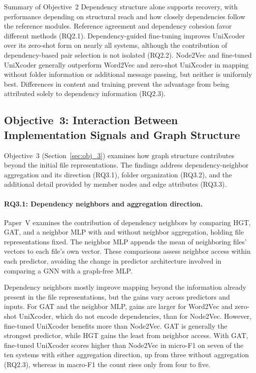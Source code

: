 \begin{GrayBox}{Summary of Objective~2}
Dependency structure alone supports recovery, with performance depending on structural reach and how closely dependencies follow the reference modules. Reference agreement and dependency cohesion favor different methods (RQ2.1). Dependency-guided fine-tuning improves UniXcoder over its zero-shot form on nearly all systems, although the contribution of dependency-based pair selection is not isolated (RQ2.2). Node2Vec and fine-tuned UniXcoder generally outperform Word2Vec and zero-shot UniXcoder in mapping without folder information or additional message passing, but neither is uniformly best. Differences in content and training prevent the advantage from being attributed solely to dependency information (RQ2.3).
\end{GrayBox}

\subsection[Objective~3: Implementation Signals and Graph Structure]{Objective~3: Interaction Between Implementation Signals and Graph Structure}\label{sec:cont_3}

Objective~3 (Section~\ref{sec:obj_3}) examines how graph structure contributes beyond the initial file representations. The findings address dependency-neighbor aggregation and its direction (RQ3.1), folder organization (RQ3.2), and the additional detail provided by member nodes and edge attributes (RQ3.3).

\paragraph{RQ3.1: Dependency neighbors and aggregation direction.} Paper~V examines the contribution of dependency neighbors by comparing HGT, GAT, and a neighbor MLP with and without neighbor aggregation, holding file representations fixed. The neighbor MLP appends the mean of neighboring files' vectors to each file's own vector. These comparisons assess neighbor access within each predictor, avoiding the change in predictor architecture involved in comparing a GNN with a graph-free MLP.

Dependency neighbors mostly improve mapping beyond the information already present in the file representations, but the gains vary across predictors and inputs. For GAT and the neighbor MLP, gains are larger for Word2Vec and zero-shot UniXcoder, which do not encode dependencies, than for Node2Vec. However, fine-tuned UniXcoder benefits more than Node2Vec. GAT is generally the strongest predictor, while HGT gains the least from neighbor access. With GAT, fine-tuned UniXcoder scores higher than Node2Vec in micro-F1 on seven of the ten systems with either aggregation direction, up from three without aggregation (RQ2.3), whereas in macro-F1 the count rises only from four to five.

